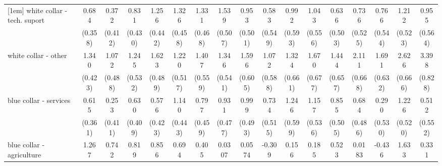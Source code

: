 {\begin{tabular}{l*{16}{c}}
[1em]
white collar - tech. suport&       0.684         &       0.372         &       0.831         &       1.256\sym{**} &       1.326\sym{**} &       1.331\sym{**} &       1.539\sym{**} &       0.953         &       0.583         &       0.992         &       1.043         &       0.636         &       0.736         &       0.766         &       1.212\sym{*}  &       0.955         \\
                    &     (0.358)         &     (0.412)         &     (0.430)         &     (0.442)         &     (0.458)         &     (0.468)         &     (0.507)         &     (0.501)         &     (0.549)         &     (0.593)         &     (0.556)         &     (0.503)         &     (0.525)         &     (0.544)         &     (0.523)         &     (0.564)         \\
[1em]
white collar - other&       1.340\sym{**} &       1.072\sym{*}  &       1.245\sym{*}  &       1.623\sym{***}&       1.220\sym{*}  &       1.407\sym{*}  &       1.346\sym{*}  &       1.596\sym{**} &       1.072         &       1.324\sym{*}  &       1.670\sym{*}  &       1.444\sym{*}  &       2.111\sym{**} &       1.691\sym{**} &       2.626\sym{***}&       3.398\sym{***}\\
                    &     (0.423)         &     (0.488)         &     (0.532)         &     (0.489)         &     (0.517)         &     (0.559)         &     (0.541)         &     (0.605)         &     (0.588)         &     (0.661)         &     (0.677)         &     (0.657)         &     (0.668)         &     (0.632)         &     (0.666)         &     (0.828)         \\
[1em]
blue collar - services&       0.615         &       0.253         &       0.630         &       0.576         &       1.140\sym{*}  &       0.797         &       0.931         &       0.999\sym{*}  &       0.734         &       1.246\sym{*}  &       1.157\sym{*}  &       0.855         &       0.684         &       0.290         &       1.226\sym{*}  &       0.512         \\
                    &     (0.361)         &     (0.411)         &     (0.409)         &     (0.423)         &     (0.443)         &     (0.459)         &     (0.477)         &     (0.493)         &     (0.515)         &     (0.599)         &     (0.536)         &     (0.505)         &     (0.486)         &     (0.530)         &     (0.520)         &     (0.552)         \\
[1em]
blue collar - agriculture&       1.267\sym{*}  &       0.742         &       0.819         &       0.856         &       0.694         &       0.405         &      0.0307         &      0.0574         &      -0.309         &       0.156         &       0.185         &       0.523         &      0.0183         &      -0.436         &       1.633\sym{*}  &       0.331         \\

\end{tabular}}
